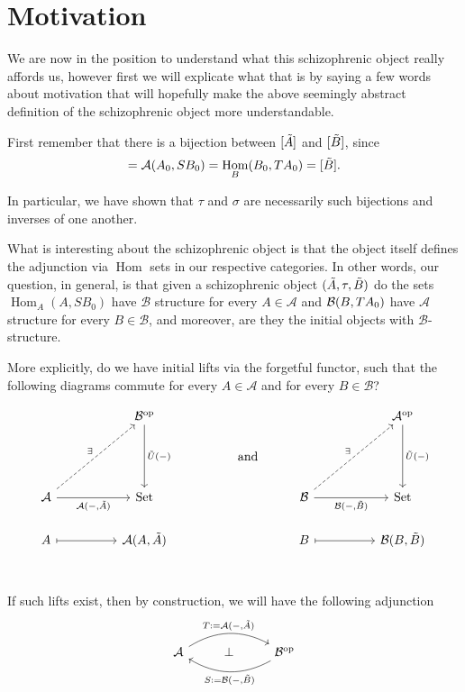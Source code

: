 \documentclass[12pt,a4paper]{article}
\DeclareMathOperator{\Hom}{Hom}
\DeclareMathOperator{\Set}{Set}
\DeclareMathOperator{\op}{op}
\def\HomA{\ensuremath\mathcal{A}}
\def\HomB{\ensuremath\mathcal{B}}
\def\t{\ensuremath\tilde}
\begin{document}
\section{Motivation}
We are now in the position to understand what this schizophrenic object really affords us, however first we will explicate what that is by  saying a few words about motivation that will hopefully make the above seemingly abstract definition of the schizophrenic object more understandable. 

First remember that there is a bijection between $[\t A]$ and $[\t B]$, since  \begin{align*}
	[\t A] = \HomA(A_0, SB_0) = \Hom_B(B_0, TA_0) = [\t B].
\end{align*}

In particular, we have shown that $\tau$ and $\sigma$ are necessarily such bijections and inverses of one another. 

What is interesting about the schizophrenic object is that the object itself defines the adjunction via $\Hom$ sets in our respective categories. In other words, our question, in general, is that given a schizophrenic object $(\t A, \tau, \t B)$ do the sets $\Hom_A(A, SB_0)$ have $\mathcal{B}$ structure for every $A \in \mathcal{A}$ and $\HomB(B, TA_0)$ have $\mathcal{A}$ structure for every $B \in \mathcal{B}$, and moreover, are they the initial objects with $\mathcal{B}$-structure. 

More explicitly, do we have initial lifts via the forgetful functor, such that the following diagrams commute for every $A \in \mathcal{A}$ and for every $B \in \mathcal{B}$?

\[\begin{tikzcd}
	&& {\mathcal{B}^{\op}} &&&&& {\mathcal{A}^{\op}} \\
	&& {} && {\text{and}} \\
	{\mathcal{A}} && \Set &&& {\mathcal{B}} && \Set \\
	A && {\HomA(A, \t A)} &&& B && {\HomB(B, \t B)} \\
	&&&&& {}
	\arrow["{\t U(-)}", from=1-3, to=3-3]
	\arrow["{\t U(-)}", from=1-8, to=3-8]
	\arrow["\exists", dashed, from=3-1, to=1-3]
	\arrow["{\HomA(-,\t A)}"', from=3-1, to=3-3]
	\arrow["\exists", dashed, from=3-6, to=1-8]
	\arrow["{\HomB(-,\t B)}"', from=3-6, to=3-8]
	\arrow[maps to, from=4-1, to=4-3]
	\arrow[maps to, from=4-6, to=4-8]
\end{tikzcd}\]
If such lifts exist, then by construction, we will have the following adjunction
\[\begin{tikzcd}
	{\mathcal{A}} & \bot & {\mathcal{B}^{\op}}
	\arrow["{T:=\HomA(-, \t A)}",  bend left, from=1-1, to=1-3, from=1-1, to=1-3]
	\arrow["{S:=\HomB(-, \t B)}", bend left, from=1-3, to=1-1, from=1-3, to=1-1]
\end{tikzcd}\]
\end{document}
